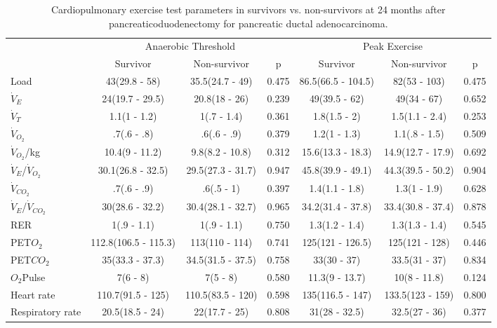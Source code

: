 \begin{sidewaystable}[p]
	\centering
	\caption{Cardiopulmonary exercise test parameters in survivors vs. non-survivors at 24 months after pancreaticoduodenectomy for pancreatic ductal adenocarcinoma. }
	\label{table:cpet_survival_24months}
	\begin{tabular}{l | c c c | c c c}
		                             &     \multicolumn{3}{c}{Anaerobic Threshold}      &       \multicolumn{3}{c}{Peak Exercise}        \\
		                             & Survivor             & Non-survivor      & p     & Survivor           & Non-survivor      & p     \\ \hline
		Load                         & 43(29.8 - 58)        & 35.5(24.7 - 49)   & 0.475 & 86.5(66.5 - 104.5) & 82(53 - 103)      & 0.475 \\
		$\dot{V}_E$                  & 24(19.7 - 29.5)      & 20.8(18 - 26)     & 0.239 & 49(39.5 - 62)      & 49(34 - 67)       & 0.652 \\
		$\dot{V}_T$                  & 1.1(1 - 1.2)         & 1(.7 - 1.4)       & 0.361 & 1.8(1.5 - 2)       & 1.5(1.1 - 2.4)    & 0.253 \\
		$\dot{V}_{O_2}$              & .7(.6 - .8)          & .6(.6 - .9)       & 0.379 & 1.2(1 - 1.3)       & 1.1(.8 - 1.5)     & 0.509 \\
		$\dot{V}_{O_2}$/kg           & 10.4(9 - 11.2)       & 9.8(8.2 - 10.8)   & 0.312 & 15.6(13.3 - 18.3)  & 14.9(12.7 - 17.9) & 0.692 \\
		$\dot{V}_E$/$\dot{V}_{O_2}$  & 30.1(26.8 - 32.5)    & 29.5(27.3 - 31.7) & 0.947 & 45.8(39.9 - 49.1)  & 44.3(39.5 - 50.2) & 0.904 \\
		$\dot{V}_{CO_2}$             & .7(.6 - .9)          & .6(.5 - 1)        & 0.397 & 1.4(1.1 - 1.8)     & 1.3(1 - 1.9)      & 0.628 \\
		$\dot{V}_E$/$\dot{V}_{CO_2}$ & 30(28.6 - 32.2)      & 30.4(28.1 - 32.7) & 0.965 & 34.2(31.4 - 37.8)  & 33.4(30.8 - 37.4) & 0.878 \\
		RER                          & 1(.9 - 1.1)          & 1(.9 - 1.1)       & 0.750 & 1.3(1.2 - 1.4)     & 1.3(1.3 - 1.4)    & 0.545 \\
		PET$O_2$                     & 112.8(106.5 - 115.3) & 113(110 - 114)    & 0.741 & 125(121 - 126.5)   & 125(121 - 128)    & 0.446 \\
		PET$CO_2$                    & 35(33.3 - 37.3)      & 34.5(31.5 - 37.5) & 0.758 & 33(30 - 37)        & 33.5(31 - 37)     & 0.834 \\
		$O_2$Pulse                   & 7(6 - 8)             & 7(5 - 8)          & 0.580 & 11.3(9 - 13.7)     & 10(8 - 11.8)      & 0.124 \\
		Heart rate                   & 110.7(91.5 - 125)    & 110.5(83.5 - 120) & 0.598 & 135(116.5 - 147)   & 133.5(123 - 159)  & 0.800 \\
		Respiratory rate             & 20.5(18.5 - 24)      & 22(17.7 - 25)     & 0.808 & 31(28 - 32.5)      & 32.5(27 - 36)     & 0.377\\ \hline
	\end{tabular}
	

\end{sidewaystable}
